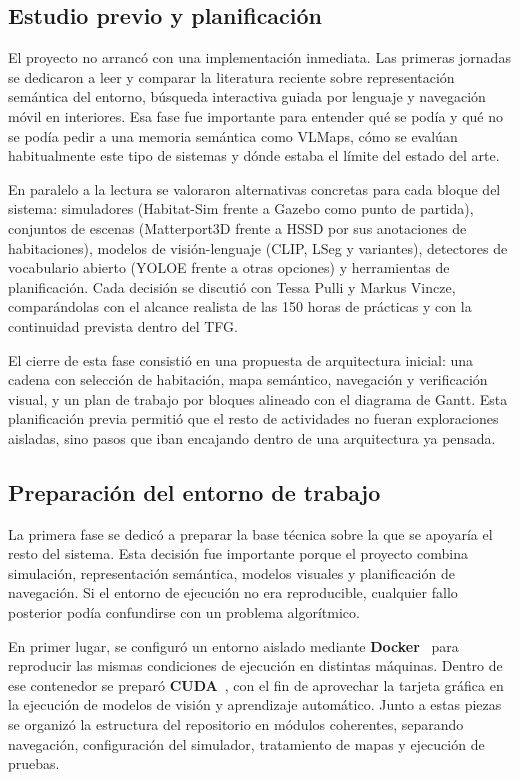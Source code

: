 \documentclass[11pt,fleqn,openany]{book} %
\let\cite=\parencite
\begin{document}
\subsection*{Estudio previo y planificación}

El proyecto no arrancó con una implementación inmediata. Las primeras jornadas se dedicaron a leer y comparar la literatura reciente sobre representación semántica del entorno, búsqueda interactiva guiada por lenguaje y navegación móvil en interiores. Esa fase fue importante para entender qué se podía y qué no se podía pedir a una memoria semántica como VLMaps, cómo se evalúan habitualmente este tipo de sistemas y dónde estaba el límite del estado del arte.

En paralelo a la lectura se valoraron alternativas concretas para cada bloque del sistema: simuladores (Habitat-Sim frente a Gazebo como punto de partida), conjuntos de escenas (Matterport3D frente a HSSD por sus anotaciones de habitaciones), modelos de visión-lenguaje (CLIP, LSeg y variantes), detectores de vocabulario abierto (YOLOE frente a otras opciones) y herramientas de planificación. Cada decisión se discutió con Tessa Pulli y Markus Vincze, comparándolas con el alcance realista de las 150 horas de prácticas y con la continuidad prevista dentro del TFG.

El cierre de esta fase consistió en una propuesta de arquitectura inicial: una cadena con selección de habitación, mapa semántico, navegación y verificación visual, y un plan de trabajo por bloques alineado con el diagrama de Gantt. Esta planificación previa permitió que el resto de actividades no fueran exploraciones aisladas, sino pasos que iban encajando dentro de una arquitectura ya pensada.

\subsection*{Preparación del entorno de trabajo}

La primera fase se dedicó a preparar la base técnica sobre la que se apoyaría el resto del sistema. Esta decisión fue importante porque el proyecto combina simulación, representación semántica, modelos visuales y planificación de navegación. Si el entorno de ejecución no era reproducible, cualquier fallo posterior podía confundirse con un problema algorítmico.

En primer lugar, se configuró un entorno aislado mediante \textbf{Docker}~\cite{docker2013} para reproducir las mismas condiciones de ejecución en distintas máquinas. Dentro de ese contenedor se preparó \textbf{CUDA}~\cite{nvidia2007cuda}, con el fin de aprovechar la tarjeta gráfica en la ejecución de modelos de visión y aprendizaje automático. Junto a estas piezas se organizó la estructura del repositorio en módulos coherentes, separando navegación, configuración del simulador, tratamiento de mapas y ejecución de pruebas.
\end{document}
